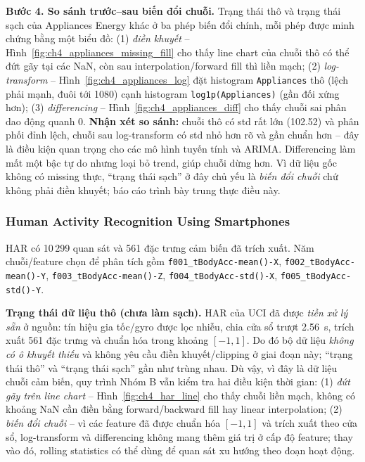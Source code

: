 \textbf{Bước 4. So sánh trước--sau biến đổi chuỗi.} Trạng thái thô và trạng thái sạch của Appliances Energy khác ở ba phép biến đổi chính, mỗi phép được minh chứng bằng một biểu đồ: (1) \emph{điền khuyết} -- Hình~\ref{fig:ch4_appliances_missing_fill} cho thấy line chart của chuỗi thô có thể đứt gãy tại các NaN, còn sau interpolation/forward fill thì liền mạch; (2) \emph{log-transform} -- Hình~\ref{fig:ch4_appliances_log} đặt histogram \texttt{Appliances} thô (lệch phải mạnh, đuôi tới 1080) cạnh histogram \texttt{log1p(Appliances)} (gần đối xứng hơn); (3) \emph{differencing} -- Hình~\ref{fig:ch4_appliances_diff} cho thấy chuỗi sai phân dao động quanh 0. \textbf{Nhận xét so sánh:} chuỗi thô có std rất lớn (102.52) và phân phối đỉnh lệch, chuỗi sau log-transform có std nhỏ hơn rõ và gần chuẩn hơn -- đây là điều kiện quan trọng cho các mô hình tuyến tính và ARIMA. Differencing làm mất một bậc tự do nhưng loại bỏ trend, giúp chuỗi dừng hơn. Vì dữ liệu gốc không có missing thực, ``trạng thái sạch'' ở đây chủ yếu là \emph{biến đổi chuỗi} chứ không phải điền khuyết; báo cáo trình bày trung thực điều này.

\subsubsection{Human Activity Recognition Using Smartphones}

HAR có 10\,299 quan sát và 561 đặc trưng cảm biến đã trích xuất. Năm chuỗi/feature chọn để phân tích gồm \texttt{f001\_tBodyAcc-mean()-X}, \texttt{f002\_tBodyAcc-mean()-Y}, \texttt{f003\_tBodyAcc-mean()-Z}, \texttt{f004\_tBodyAcc-std()-X}, \texttt{f005\_tBodyAcc-std()-Y}.

\textbf{Trạng thái dữ liệu thô (chưa làm sạch).} HAR của UCI đã được \emph{tiền xử lý sẵn} ở nguồn: tín hiệu gia tốc/gyro được lọc nhiễu, chia cửa sổ trượt 2.56~s, trích xuất 561 đặc trưng và chuẩn hóa trong khoảng $[-1,1]$. Do đó bộ dữ liệu \emph{không có ô khuyết thiếu} và không yêu cầu điền khuyết/clipping ở giai đoạn này; ``trạng thái thô'' và ``trạng thái sạch'' gần như trùng nhau. Dù vậy, vì đây là dữ liệu chuỗi cảm biến, quy trình Nhóm B vẫn kiểm tra hai điều kiện thời gian: (1) \emph{đứt gãy trên line chart} -- Hình~\ref{fig:ch4_har_line} cho thấy chuỗi liền mạch, không có khoảng NaN cần điền bằng forward/backward fill hay linear interpolation; (2) \emph{biến đổi chuỗi} -- vì các feature đã được chuẩn hóa $[-1,1]$ và trích xuất theo cửa sổ, log-transform và differencing không mang thêm giá trị ở cấp độ feature; thay vào đó, rolling statistics có thể dùng để quan sát xu hướng theo đoạn hoạt động.

